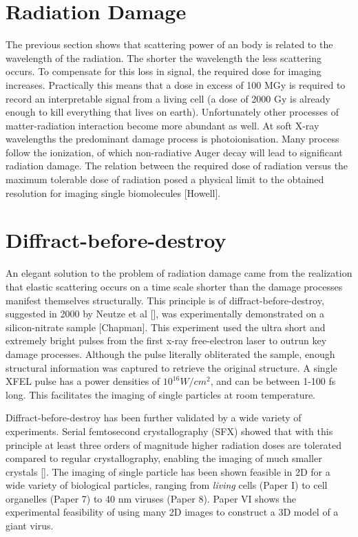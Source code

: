\section{Radiation Damage}
The previous section shows that scattering power of an body is related to the wavelength of the radiation. The shorter the wavelength the less scattering occurs. To compensate for this loss in signal, the required dose for imaging increases. Practically this means that a dose in excess of 100 MGy is required to record an interpretable signal from a living cell (a dose of 2000 Gy is already enough to kill everything that lives on earth). Unfortunately other processes of matter-radiation interaction become more abundant as well. At soft X-ray wavelengths the predominant damage process is photoionisation. Many process follow the ionization, of which non-radiative Auger decay will lead to significant radiation damage. The relation between the required dose of radiation versus the maximum tolerable dose of radiation posed a physical limit to the obtained resolution for imaging single biomolecules [Howell].

\section{Diffract-before-destroy}
An elegant solution to the problem of radiation damage came from the realization that elastic scattering occurs on a  time scale shorter than the damage processes manifest themselves structurally. This principle is of diffract-before-destroy, suggested in 2000 by Neutze et al [], was experimentally demonstrated on a silicon-nitrate sample [Chapman]. This experiment used the ultra short and extremely bright pulses from the first x-ray free-electron laser to outrun key damage processes. Although the pulse literally obliterated the sample, enough structural information was captured to retrieve the original structure. A single XFEL pulse has a power densities of $10^16 W/cm^2$, and can be between 1-100 fs long. This facilitates the imaging of single particles at room temperature.

Diffract-before-destroy has been further validated by a wide variety of experiments. Serial femtosecond crystallography (SFX) showed that with this principle at least three orders of magnitude higher radiation doses are tolerated compared to regular crystallography, enabling the imaging of much smaller crystals []. The imaging of single particle has been shown feasible in 2D for a wide variety of biological particles, ranging from \textit{living} cells (Paper I) to cell organelles (Paper 7) to  40 nm viruses (Paper 8). Paper VI shows the experimental feasibility of using many 2D images to construct a 3D model of a giant virus.

